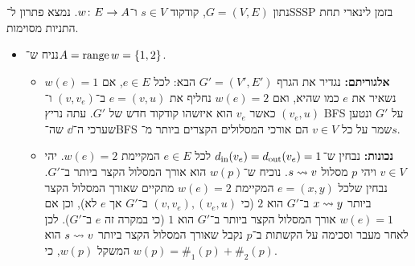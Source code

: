 \documentclass[]{../../../../tex/classes/homework}
\begin{document}
	\section{}
	נתון $G = (V, E)$, קודקוד $s \in V$ ו־$w \colon E \to A$. נמצא פתרון ל־SSSP בזמן לינארי תחת התניות מסוימות. 
	\begin{itemize}
		\item נניח ש־$A = \operatorname{range} w = \{1, 2\}$. 
		\begin{itemize}
			\item \textbf{אלגוריתם: }נגדיר את הגרף $G' = (V', E')$ הבא: לכל $e \in E$, אם $w(e) = 1$ נשאיר את $e$ כמו שהיא, ואם $w(e) = 2$ נחליף את $e = (v, u)$ ב־$(v, v_{e})$ ו־$(v_e, u)$ כאשר $v_e$ הוא איזשהו קודקוד חדש של $G'$. עתה נריץ BFS על $G'$ ונטען שערכי ה־$\dd$ שה־BFS שמר על כל $v \in V$ הם אורכי המסלולים הקצרים ביותר מ־$s$. 
			\item \textbf{נכונות: }נבחין ש־$d_{\mathrm{in}}(v_e) = d_{\mathrm{out}}(v_e) = 1$ לכל $e \in E$ המקיימת $w(e) = 2$. יהי $v \in V$ ויהי $p$ מסלול $s \rightsquigarrow v$. נוכיח ש־$w(p)$ הוא אורך המסלול הקצר ביותר ב־$G'$. נבחין שלכל $e = (x, y)$ המקיימת $w(e) = 2$ מתקיים שאורך המסלול הקצר ביותר $x \rightsquigarrow y$ ב־$G'$ הוא $2$ (כי $(v, v_e), (v_e, u)$ ב־$G'$ אך $e$ לא), וכן אם $w(e) = 1$ אורך המסלול הקצר ביותר ב־$G'$ הוא $1$ (כי במקרה זה $e$ ב־$G'$). לכן לאחר מעבר וסכימה על הקשתות ב־$p$ נקבל שאורך המסלול הקצר ביותר $s \rightsquigarrow v$ הוא המשקל $w(p)$, כי $w(p) = \#_1(p) + \#_2(p)$. 
			

\end{itemize}
\end{itemize}
\end{document}
